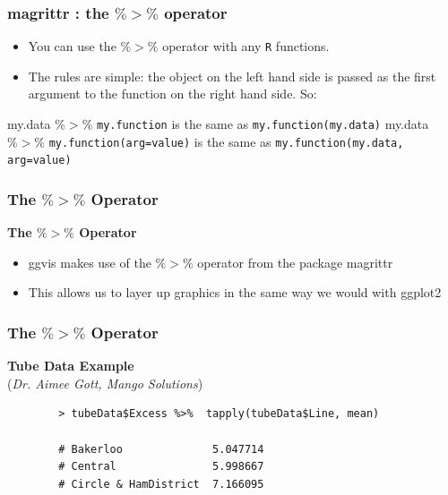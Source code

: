 \documentclass{beamer}
\begin{document}
\begin{frame}
	\frametitle{magrittr :  the $\%>\%$ operator}
	\begin{itemize}
		\item You can use the $\%>\%$ operator with any \texttt{R} functions.
		\item The rules are simple: the object on the left hand side is passed as the first argument to the function on the right hand side. So: 
	\end{itemize}
	\begin{framed}	
		my.data $\%>\%$ \texttt{my.function} is the same as \texttt{my.function(my.data)}
		my.data $\%>\%$ \texttt{my.function(arg=value)} is the same as \texttt{my.function(my.data, arg=value)}
	\end{framed}
	
\end{frame}
\begin{frame}[fragile]
	\frametitle{The $ \%>\% $ Operator}
	\Large
	\textbf{The $ \%>\% $ Operator}
	\begin{itemize}
		\item ggvis makes use of the $ \%>\% $ operator from the
		package magrittr
		\item This allows us to layer up graphics in the same
		way we would with ggplot2
		
	\end{itemize}
	
	
\end{frame}
\begin{frame}[fragile]
	\frametitle{The $ \%>\% $ Operator}
	\textbf{Tube Data Example }\\ (\textit{Dr. Aimee Gott, Mango Solutions})
	
	\begin{framed}
		\begin{verbatim}
		> tubeData$Excess %>%  tapply(tubeData$Line, mean)
		
		# Bakerloo              5.047714
		# Central               5.998667
		# Circle & HamDistrict  7.166095 
		
		\end{verbatim}
	\end{framed}
	
\end{frame}
\end{document}
